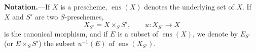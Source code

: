 



\noindent\textbf{Notation.}---If \(X\) is a prescheme,
\(\operatorname{ens}(X)\) denotes the underlying set of \(X\). If
\(X\) and \(S'\) are two \(S\)-preschemes,
\[
  X_{S'}=X\times_S S',
  \qquad u:X_{S'}\longrightarrow X
\]
is the canonical morphism, and if \(E\) is a subset of
\(\operatorname{ens}(X)\), we denote by \(E_{S'}\) (or
\(E\times_S S'\)) the subset \(u^{-1}(E)\) of
\(\operatorname{ens}(X_{S'})\).

